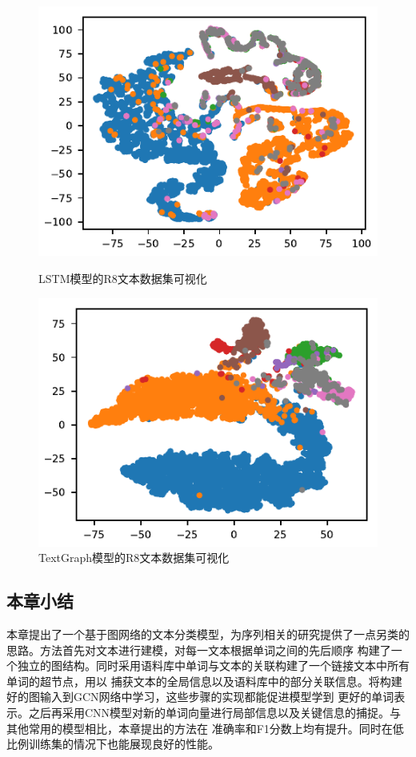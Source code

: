\begin{figure}[htb]
    \begin{minipage}[t]{0.5\linewidth}
    \centering
    \includegraphics[width=1\textwidth]{pic/R8-RNN.pdf}
    \caption{LSTM模型的R8文本数据集可视化}
    \label{r8_embeding}
    \end{minipage}
    \quad
    \begin{minipage}[t]{0.5\linewidth}
    \centering
    \includegraphics[width=1\textwidth]{pic/R8-TextGraph.pdf}
    \caption{TextGraph模型的R8文本数据集可视化}
    \label{R8_TextGraph}
    \end{minipage}
\end{figure}

\subsection{本章小结}
本章提出了一个基于图网络的文本分类模型，为序列相关的研究提供了一点另类的思路。方法首先对文本进行建模，对每一文本根据单词之间的先后顺序
构建了一个独立的图结构。同时采用语料库中单词与文本的关联构建了一个链接文本中所有单词的超节点，用以
捕获文本的全局信息以及语料库中的部分关联信息。将构建好的图输入到GCN网络中学习，这些步骤的实现都能促进模型学到
更好的单词表示。之后再采用CNN模型对新的单词向量进行局部信息以及关键信息的捕捉。与其他常用的模型相比，本章提出的方法在
准确率和F1分数上均有提升。同时在低比例训练集的情况下也能展现良好的性能。